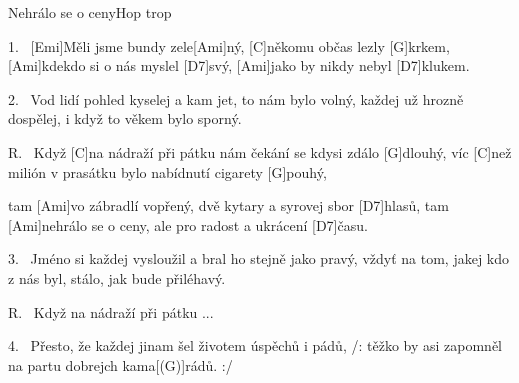\begin{song}{Nehrálo se o ceny}{Hop trop}

\begin{xverse}{1.~}
[\large Emi]Měli jsme bundy zele[\large Ami]ný, [\large C]někomu občas lezly [\large G]krkem,
[\large Ami]kdekdo si o nás myslel [\large D7]svý, [\large Ami]jako by nikdy nebyl [\large D7]klukem.
\end{xverse}

\begin{xverse}{2.~}
Vod lidí pohled kyselej a kam jet, to nám bylo volný,
každej už hrozně dospělej, i když to věkem bylo sporný.
\end{xverse}

\begin{xverse}{R.~}
Když [\large C]na nádraží při pátku nám čekání se kdysi zdálo [\large G]dlouhý,
víc [\large C]než milión v prasátku bylo nabídnutí cigarety [\large G]pouhý,
\end{xverse}

\begin{xverse}{}
tam [\large Ami]vo zábradlí vopřený, dvě kytary a syrovej sbor [\large D7]hlasů,
tam [\large Ami]nehrálo se o ceny, ale pro radost a ukrácení [\large D7]{ča}su.
\end{xverse}

\begin{xverse}{3.~}
Jméno si každej vysloužil a bral ho stejně jako pravý,
vždyť na tom, jakej kdo z nás byl, stálo, jak bude přiléhavý.
\end{xverse}

\begin{xverse}{R.~}
Když na nádraží při pátku ...
\end{xverse}

\begin{xverse}{4.~}
Přesto, že každej jinam šel životem úspěchů i pádů,
/: těžko by asi zapomněl na partu dobrejch kama[\large (G)]rádů. :/
\end{xverse}

\end{song}

